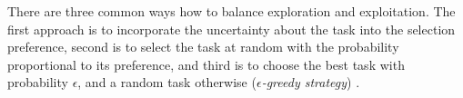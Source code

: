 There are three common ways how to balance exploration and exploitation.
The first approach is to incorporate the uncertainty about the task into the selection
preference, %
second is to select the task at random with the probability proportional to its
preference, %
and third is to choose the best task with probability $\epsilon$, and
a random task otherwise (\emph{$\epsilon$-greedy strategy})
\cite{rl}.






